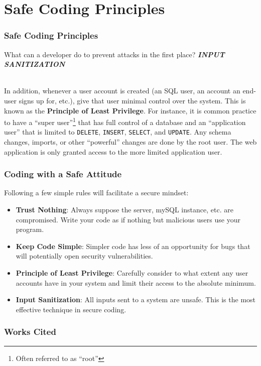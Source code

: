 \documentclass[aspectratio=169]{beamer}
\begin{document}
\section{Safe Coding Principles}
\begin{frame}
\frametitle{Safe Coding Principles}
What can a developer do to prevent attacks in the first place?
\pause
\textbf{\emph{INPUT SANITIZATION}}

\pause
\mbox{}\\
In addition, whenever a user account is created (an SQL user, an account an end-user signs up for, etc.), give that user minimal control over the system. This is known as the \textbf{Principle of Least Privilege}. \cite{owasp} For instance, it is common practice to have a ``super user''\footnote{Often referred to as ``root''} that has full control of a database and an ``application user'' that is limited to \texttt{DELETE}, \texttt{INSERT}, \texttt{SELECT}, and \texttt{UPDATE}. Any schema changes, imports, or other ``powerful'' changes are done by the root user. The web application is only granted access to the more limited application user.
\end{frame}

\begin{frame}
\frametitle{Coding with a Safe Attitude}
Following a few simple rules will facilitate a secure mindset:
\begin{itemize}
	\item \textbf{Trust Nothing}: Always suppose the server, mySQL instance, etc. are compromised. Write your code as if nothing but malicious users use your program.
	\item \textbf{Keep Code Simple}: Simpler code has less of an opportunity for bugs that will potentially open security vulnerabilities.
	\item \textbf{Principle of Least Privilege}: Carefully consider to what extent any user accounts have in your system and limit their access to the absolute minimum.
	\item \textbf{Input Sanitization}: All inputs sent to a system are unsafe. This is the most effective technique in secure coding.
\end{itemize}
\end{frame}

\begin{frame}
\frametitle{Works Cited}

\end{frame}
\end{document}
